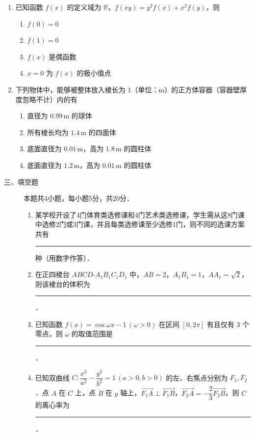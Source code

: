 \begin{description}
\begin{enumerate}[leftmargin=5pt]
        \item 已知函数 $f(x)$ 的定义域为 $\mathbb{R}$，$f(xy)=y^2f(x)+x^2f(y)$，则
        \begin{enumerate}[label=\Alph*.]
            \item $f(0)=0$
            \item $f(1)=0$
            \item $f(x)$ 是偶函数
            \item $x=0$ 为 $f(x)$ 的极小值点
        \end{enumerate}

        \item 下列物体中，能够被整体放入棱长为 $1$（单位：m）的正方体容器（容器壁厚度忽略不计）内的有
        \begin{enumerate}[label=\Alph*.]
            \item 直径为 $0.99\,\text{m}$ 的球体
            \item 所有棱长均为 $1.4\,\text{m}$ 的四面体
            \item 底面直径为 $0.01\,\text{m}$，高为 $1.8\,\text{m}$ 的圆柱体
            \item 底面直径为 $1.2\,\text{m}$，高为 $0.01\,\text{m}$ 的圆柱体
        \end{enumerate}
    \end{enumerate}
\end{description}

\begin{description}
    \item[三、填空题] 本题共4小题，每小题5分，共20分．
    \begin{enumerate}[leftmargin=5pt]
      \addtocounter{enumi}{+12}
        \item 某学校开设了4门体育类选修课和4门艺术类选修课，学生需从这8门课中选修2门或3门课，并且每类选修课至少选修1门，则不同的选课方案共有 \rule[-0.3ex]{3em}{0.4pt} 种（用数字作答）．
        \item 在正四棱台 $ABCD$-$A_1B_1C_1D_1$ 中，$AB=2$，$A_1B_1=1$，$AA_1=\sqrt{2}$，则该棱台的体积为 \rule[-0.3ex]{3em}{0.4pt}．
        \item 已知函数 $f(x)=\cos\omega x-1\,(\omega>0)$ 在区间 $[0,2\pi]$ 有且仅有 $3$ 个零点，则 $\omega$ 的取值范围是 \rule[-0.3ex]{3em}{0.4pt}．
        \item 已知双曲线 $C:\dfrac{x^2}{a^2}-\dfrac{y^2}{b^2}=1\,(a>0,b>0)$ 的左、右焦点分别为 $F_1,F_2$．点 $A$ 在 $C$ 上，点 $B$ 在 $y$ 轴上，$\overrightarrow{F_1A}\perp\overrightarrow{F_1B}$，$\overrightarrow{F_2A}=-\dfrac{2}{3}\overrightarrow{F_2B}$，则 $C$ 的离心率为 \rule[-0.3ex]{3em}{0.4pt}．
    \end{enumerate}
\end{description}

